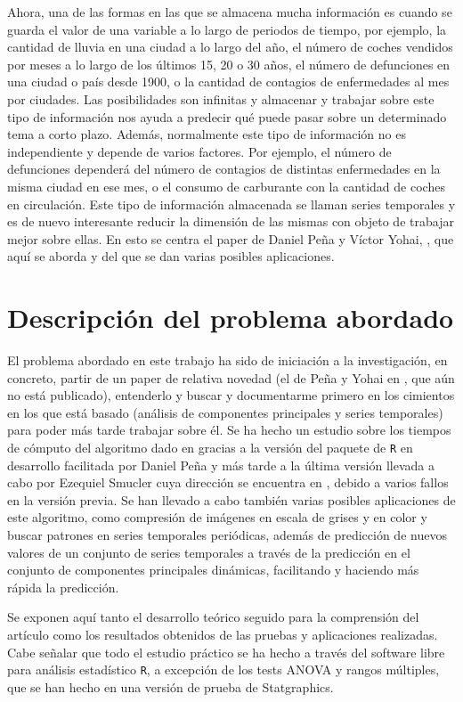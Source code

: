 Ahora, una de las formas en las que se almacena mucha información es cuando se guarda el valor de una variable a lo largo de periodos de tiempo, por ejemplo, la cantidad de lluvia en una ciudad a lo largo del año, el número de coches vendidos por meses a lo largo de los últimos 15, 20 o 30 años, el número de defunciones en una ciudad o país desde 1900, o la cantidad de contagios de enfermedades al mes por ciudades. Las posibilidades son infinitas y almacenar y trabajar sobre este tipo de información nos ayuda a predecir qué puede pasar sobre un determinado tema a corto plazo. Además, normalmente este tipo de información no es independiente y depende de varios factores. Por ejemplo, el número de defunciones dependerá del número de contagios de distintas enfermedades en la misma ciudad en ese mes, o el consumo de carburante con la cantidad de coches en circulación. Este tipo de información almacenada se llaman series temporales y es de nuevo interesante reducir la dimensión de las mismas con objeto de trabajar mejor sobre ellas. En esto se centra el paper de Daniel Peña y Víctor Yohai, \cite{pena16}, que aquí se aborda y del que se dan varias posibles aplicaciones.


\section{Descripción del problema abordado}
El problema abordado en este trabajo ha sido de iniciación a la investigación, en concreto, partir de un paper de relativa novedad (el de Peña y Yohai en \cite{pena16}, que aún no está publicado), entenderlo y buscar y documentarme primero en los cimientos en los que está basado (análisis de componentes principales y series temporales) para poder más tarde trabajar sobre él. Se ha hecho un estudio sobre los tiempos de cómputo del algoritmo dado en \cite{pena16} gracias a la versión del paquete de \texttt{R} en desarrollo facilitada por Daniel Peña y más tarde a la última versión llevada a cabo por Ezequiel Smucler cuya dirección se encuentra en \cite{ezeq}, debido a varios fallos en la versión previa. Se han llevado a cabo también varias posibles aplicaciones de este algoritmo, como compresión de imágenes en escala de grises y en color y buscar patrones en series temporales periódicas, además de predicción de nuevos valores de un conjunto de series temporales a través de la predicción en el conjunto de componentes principales dinámicas, facilitando y haciendo más rápida la predicción.

Se exponen aquí tanto el desarrollo teórico seguido para la comprensión del artículo como los resultados obtenidos de las pruebas y aplicaciones realizadas. Cabe señalar que todo el estudio práctico se ha hecho a través del software libre para análisis estadístico \texttt{R}, a excepción de los tests ANOVA y rangos múltiples, que se han hecho en una versión de prueba de Statgraphics.


